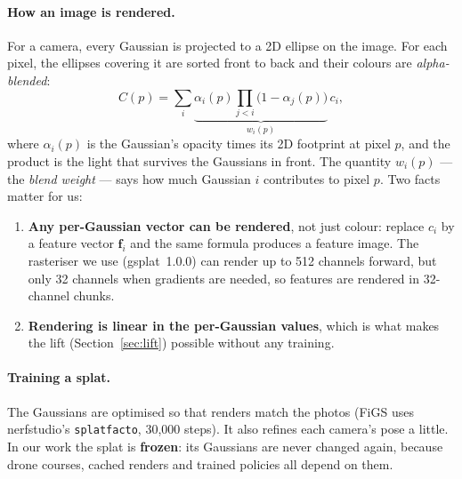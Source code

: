 \documentclass[11pt,a4paper]{article}
\newcommand{\code}[1]{\texttt{#1}}
\newcommand{\vect}[1]{\mathbf{#1}}
\begin{document}
\paragraph{How an image is rendered.} For a camera, every Gaussian is projected to a 2D ellipse on the image. For each
pixel, the ellipses covering it are sorted front to back and their colours are \emph{alpha-blended}:
\begin{equation}
  C(p) = \sum_{i} \underbrace{\alpha_i(p) \prod_{j<i}\bigl(1-\alpha_j(p)\bigr)}_{w_i(p)} \, c_i ,
\end{equation}
where $\alpha_i(p)$ is the Gaussian's opacity times its 2D footprint at pixel $p$, and the product is the light
that survives the Gaussians in front. The quantity $w_i(p)$ --- the \emph{blend weight} --- says how much Gaussian
$i$ contributes to pixel $p$. Two facts matter for us:
\begin{enumerate}
  \item \textbf{Any per-Gaussian vector can be rendered}, not just colour: replace $c_i$ by a feature vector
        $\vect{f}_i$ and the same formula produces a feature image. The rasteriser we use (gsplat~1.0.0) can
        render up to 512 channels forward, but only 32 channels when gradients are needed, so features are rendered
        in 32-channel chunks.
  \item \textbf{Rendering is linear in the per-Gaussian values}, which is what makes the lift (Section~\ref{sec:lift})
        possible without any training.
\end{enumerate}

\paragraph{Training a splat.} The Gaussians are optimised so that renders match the photos (FiGS uses nerfstudio's
\code{splatfacto}, 30{,}000 steps). It also refines each camera's pose a little. In our work the splat is
\textbf{frozen}: its Gaussians are never changed again, because drone courses, cached renders and trained policies all
depend on them.
\end{document}
